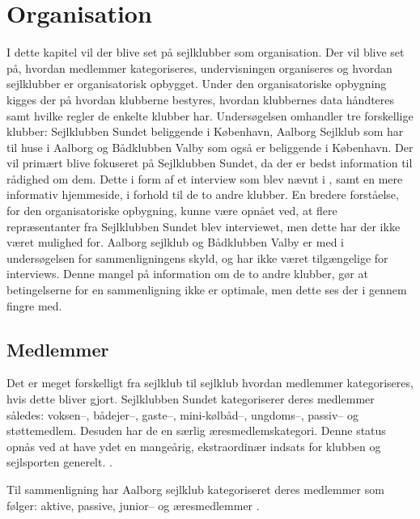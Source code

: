 \chapter{Organisation}\label{chap:organisation}

I dette kapitel vil der blive set på sejlklubber som organisation. Der vil blive set på, hvordan medlemmer
kategoriseres, undervisningen organiseres og hvordan sejlklubber er organisatorisk opbygget. Under den
organisatoriske opbygning kigges der på hvordan klubberne bestyres, hvordan klubbernes data håndteres samt
hvilke regler de enkelte klubber har. Undersøgelsen omhandler tre forskellige klubber: Sejlklubben Sundet
beliggende i København, Aalborg Sejlklub  som har til huse i Aalborg
og Bådklubben Valby som også er beliggende i København. Der vil primært blive fokuseret på Sejlklubben Sundet,
da der er bedst information til rådighed om dem. Dette i form af et interview som blev nævnt i
, samt en mere informativ hjemmeside, i forhold til de to
andre klubber. En bredere forståelse, for den organisatoriske opbygning, kunne være opnået ved, at flere repræsentanter
fra Sejlklubben Sundet blev interviewet, men dette har der ikke været mulighed for.
 Aalborg sejlklub og Bådklubben Valby er med i undersøgelsen for sammenligningens skyld, og har
ikke været tilgængelige for interviews. Denne mangel på information om de to andre klubber, gør at betingelserne for en
sammenligning ikke er optimale, men dette ses der i gennem fingre med. 


\section{Medlemmer}\label{sec:organisation-medlemmer}

Det er meget forskelligt fra sejlklub til sejlklub hvordan medlemmer kategoriseres, hvis dette bliver gjort.
Sejlklubben Sundet kategoriserer deres medlemmer således: voksen--, bådejer--, gaste--, mini-kølbåd--,
ungdoms--, passiv-- og støttemedlem. Desuden har de en særlig æresmedlemskategori. Denne status opnås ved at
have ydet en mangeårig, ekstraordinær indsats for klubben og sejlsporten generelt. \citep{sundet_vedtaegter}.

Til sammenligning har Aalborg sejlklub kategoriseret deres medlemmer som følger: aktive, passive, junior-- og
æresmedlemmer \citep{aalborg_sejlklub_vedtaegter}.

